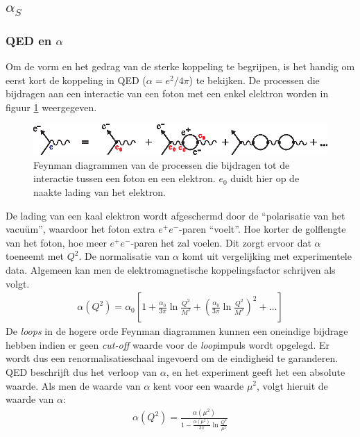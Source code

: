 \documentclass[a4paper,11pt]{article}
\numberwithin{equation}{section} %
\begin{document}
  \subsection{$\alpha_S$}
    \subsubsection{QED en $\alpha$} \label{sec:QED}
Om de vorm en het gedrag van de sterke koppeling te begrijpen, is het handig om eerst kort de koppeling in QED ($\alpha = e^2/4\pi$) te bekijken.
De processen die bijdragen aan een interactie van een foton met een enkel elektron worden in figuur \ref{fig:QED} weergegeven.
\begin{figure} [H]
  \begin{center}
    \includegraphics[width=.66\textwidth]{Afbeeldingen/QED.eps}
    \caption{Feynman diagrammen van de processen die bijdragen tot de interactie tussen een foton en een elektron. $e_0$ duidt hier op de naakte lading van het elektron.}
   \label{fig:QED}
  \end{center}
\end{figure}
De lading van een kaal elektron wordt afgeschermd door de “polarisatie van het vacuüm”, waardoor het foton extra $e^+ e^-$-paren “voelt”.
Hoe korter de golflengte van het foton, hoe meer $e^+ e^-$-paren het zal voelen.
Dit zorgt ervoor dat $\alpha$ toeneemt met $Q^2$.
De normalisatie van $\alpha$ komt uit vergelijking met experimentele data.
Algemeen kan men de elektromagnetische koppelingsfactor schrijven als volgt.
\begin{align}
\alpha(Q^2) = \alpha_0 \left[ 1+ \frac{\alpha_0}{3\pi} \ln{\frac{Q^2}{M^2}} + \left( \frac{\alpha_0}{3\pi} \ln{\frac{Q^2}{M^2}} \right)^2 +\hdots \right]
\end{align}
De \textit{loops} in de hogere orde Feynman diagrammen kunnen een oneindige bijdrage hebben indien er geen \textit{cut-off} waarde voor de \textit{loop}impuls wordt opgelegd.
Er wordt dus een renormalisatieschaal ingevoerd om de eindigheid te garanderen.
QED beschrijft dus het verloop van $\alpha$, en het experiment geeft het een absolute waarde.
Als men de waarde van $\alpha$ kent voor een waarde $\mu^2$, volgt hieruit de waarde van $\alpha$:
\begin{align} \label{eq:alpha}
\alpha( Q^2 ) =\frac{\alpha(\mu^2)}{1-\frac{\alpha(\mu^2)}{3\pi} \ln{\frac{Q^2}{\mu^2}}}
\end{align}
\end{document}
